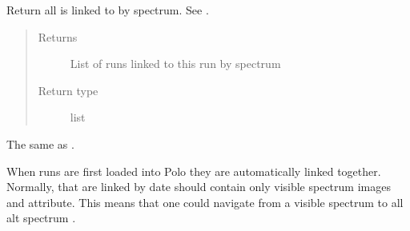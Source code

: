 \documentclass[letterpaper,10pt,english]{sphinxmanual}
\begin{document}
\begin{fulllineitems}
\begin{fulllineitems}
\label{\detokenize{polo.crystallography:polo.crystallography.run.HWIRun.get_linked_alt_runs}}
Return all  is linked to by spectrum. See
.
\begin{quote}\begin{description}
\item[{Returns}] \leavevmode
List of runs linked to this run by spectrum

\item[{Return type}] \leavevmode
list

\end{description}\end{quote}

\end{fulllineitems}


\begin{fulllineitems}
\label{\detokenize{polo.crystallography:polo.crystallography.run.HWIRun.get_tooltip}}
The same as .

\end{fulllineitems}


\begin{fulllineitems}
\label{\detokenize{polo.crystallography:polo.crystallography.run.HWIRun.insert_into_alt_spec_chain}}
When runs are first loaded into Polo they are automatically linked together.
Normally,  that are linked by date should contain only 
visible spectrum images and  attribute.
This means that one could navigate from a visible
spectrum {\hyperref[\detokenize{polo.crystallography:polo.crystallography.run.HWIRun}]{}} to all alt spectrum 
.


\end{fulllineitems}
\end{fulllineitems}
\end{document}
